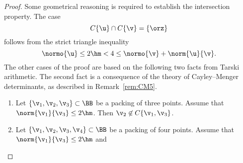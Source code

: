 \begin{proof}
 Some geometrical reasoning is required to
establish the intersection property.  The case
\[ 
C\{\u\}\cap C\{\v\} = \{\orz\}
\] 
follows from the strict triangle inequality 
\[ 
\normo{\u} \le 2\hm < 4 \le \normo{\v} + \norm{\u}{\v}.
\] 
The other cases of the proof are based on the following two facts from
Tarski arithmetic.  The second fact is a consequence of the theory of
Cayley--Menger determinants, as described in Remark~\ref{rem:CM5}.
\begin{enumerate}
\item {} Let $\{\v_1,\v_2,\v_3\}\subset \BB$ be a
  packing of three points.  Assume that $\norm{\v_1}{\v_3}\le 2\hm$.
  Then $\v_2\not\in C\{\v_1,\v_3\}$.
\item {} Let $\{\v_1,\v_2,\v_3,\v_4\}\subset \BB$ be a
  packing of four points.  Assume that $\norm{\v_1}{\v_3}\le 2\hm$ and

\end{enumerate}
\end{proof}
